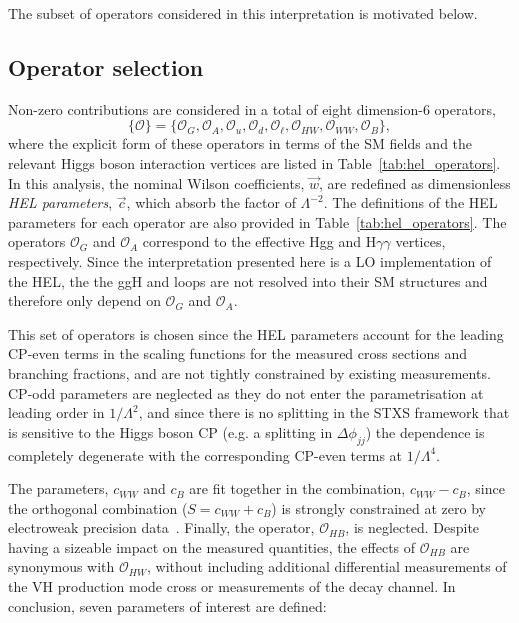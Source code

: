 \noindent
The subset of operators considered in this interpretation is motivated below.

\subsection{Operator selection}\label{sec:eft_operator}
Non-zero contributions are considered in a total of eight dimension-6 operators,
\begin{equation}
    \{\mathcal{O}\} = \{\mathcal{O}_G,\mathcal{O}_A,\mathcal{O}_u,\mathcal{O}_d,\mathcal{O}_\ell,\mathcal{O}_{HW},\mathcal{O}_{WW},\mathcal{O}_B\},
\end{equation}
\noindent
where the explicit form of these operators in terms of the SM fields and the relevant Higgs boson interaction vertices are listed in Table~\ref{tab:hel_operators}. In this analysis, the nominal Wilson coefficients, $\vec{w}$, are redefined as dimensionless \textit{HEL parameters}, $\vec{c}$, which absorb the factor of $\Lambda^{-2}$. The definitions of the HEL parameters for each operator are also provided in Table~\ref{tab:hel_operators}. The operators $\mathcal{O}_G$ and $\mathcal{O}_A$ correspond to the effective Hgg and H$\gamma\gamma$ vertices, respectively. Since the interpretation presented here is a LO implementation of the HEL, the the ggH and \Hgg loops are not resolved into their SM structures and therefore only depend on $\mathcal{O}_G$ and $\mathcal{O}_A$.

This set of operators is chosen since the HEL parameters account for the leading CP-even terms in the scaling functions for the measured cross sections and branching fractions, and are not tightly constrained by existing measurements. CP-odd parameters are neglected as they do not enter the parametrisation at leading order in $1/\Lambda^2$, and since there is no splitting in the STXS framework that is sensitive to the Higgs boson CP (e.g. a splitting in $\Delta\phi_{jj}$) the dependence is completely degenerate with the corresponding CP-even terms at $1/\Lambda^4$.

The parameters, $c_{WW}$ and $c_B$ are fit together in the combination, $c_{WW}-c_B$, since the orthogonal combination ($S=c_{WW}+c_B$) is strongly constrained at zero by electroweak precision data~\cite{Ellis:2014jta}. Finally, the operator, $\mathcal{O}_{HB}$, is neglected. Despite having a sizeable impact on the measured quantities, the effects of $\mathcal{O}_{HB}$ are synonymous with $\mathcal{O}_{HW}$, without including additional differential measurements of the VH production mode cross or measurements of the \HZg decay channel. In conclusion, seven parameters of interest are defined:

